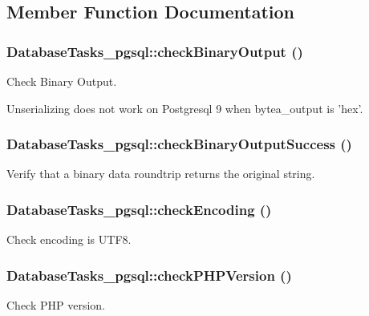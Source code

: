 \subsection{Member Function Documentation}
\hypertarget{classDatabaseTasks__pgsql_a01af0799725c2613f71ad1f9cf9bb898}{
\subsubsection[{checkBinaryOutput}]{\setlength{\rightskip}{0pt plus 5cm}DatabaseTasks\_\-pgsql::checkBinaryOutput ()}}
\label{classDatabaseTasks__pgsql_a01af0799725c2613f71ad1f9cf9bb898}
Check Binary Output.

Unserializing does not work on Postgresql 9 when bytea\_\-output is 'hex'. \hypertarget{classDatabaseTasks__pgsql_a03e035838c5fb114500d9f27719a8ab2}{
\subsubsection[{checkBinaryOutputSuccess}]{\setlength{\rightskip}{0pt plus 5cm}DatabaseTasks\_\-pgsql::checkBinaryOutputSuccess ()}}
\label{classDatabaseTasks__pgsql_a03e035838c5fb114500d9f27719a8ab2}
Verify that a binary data roundtrip returns the original string. \hypertarget{classDatabaseTasks__pgsql_af2f3d31e7c5bfa05c06b248c836df3b1}{
\subsubsection[{checkEncoding}]{\setlength{\rightskip}{0pt plus 5cm}DatabaseTasks\_\-pgsql::checkEncoding ()}}
\label{classDatabaseTasks__pgsql_af2f3d31e7c5bfa05c06b248c836df3b1}
Check encoding is UTF8. \hypertarget{classDatabaseTasks__pgsql_a63fd0ad79a60d9a108492a18953cdaa4}{
\subsubsection[{checkPHPVersion}]{\setlength{\rightskip}{0pt plus 5cm}DatabaseTasks\_\-pgsql::checkPHPVersion ()}}
\label{classDatabaseTasks__pgsql_a63fd0ad79a60d9a108492a18953cdaa4}
Check PHP version.

